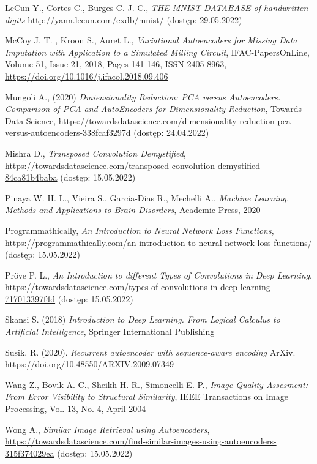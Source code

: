 \documentclass[12pt]{mwbk}
\theoremstyle{plain}
\theoremstyle{definition}
\theoremstyle{remark}
\begin{document}
\begin{thebibliography}{99}
 LeCun Y., Cortes C., Burges C. J. C., \emph{THE MNIST DATABASE of handwritten digits} \url{http://yann.lecun.com/exdb/mnist/} (dostęp: 29.05.2022)

 McCoy J. T. , Kroon S.,  Auret L.,
\emph{Variational Autoencoders for Missing Data Imputation with Application to a Simulated Milling Circuit},
IFAC-PapersOnLine,
 Volume 51, Issue 21,
 2018,
 Pages 141-146,
 ISSN 2405-8963, \url{https://doi.org/10.1016/j.ifacol.2018.09.406}

 Mungoli A., (2020) \emph{Dmiensionality Reduction: PCA versus Autoencoders. Comparison of PCA and AutoEncoders for Dimensionality Reduction}, Towards Data Science, \url{https://towardsdatascience.com/dimensionality-reduction-pca-versus-autoencoders-338fcaf3297d} (dostęp: 24.04.2022)

 Mishra D., \emph{Transposed Convolution Demystified}, \url{https://towardsdatascience.com/transposed-convolution-demystified-84ca81b4baba} (dostęp: 15.05.2022)



 Pinaya W. H. L., Vieira S., Garcia-Dias R., Mechelli A., \emph{Machine Learning. Methods and Applications to Brain Disorders}, Academic Press,
2020

 Programmathically, \emph{An Introduction to Neural Network Loss Functions}, \url{https://programmathically.com/an-introduction-to-neural-network-loss-functions/} (dostęp: 15.05.2022)

 Pröve P. L., \emph{An Introduction to different Types of Convolutions in Deep Learning}, \url{https://towardsdatascience.com/types-of-convolutions-in-deep-learning-717013397f4d} (dostęp: 15.05.2022)

 Skansi S. (2018) \emph{Introduction to Deep Learning. From Logical Calculus to Artificial Intelligence}, Springer International Publishing

 Susik, R. (2020). \emph{Recurrent autoencoder with sequence-aware encoding} ArXiv. https://doi.org/10.48550/ARXIV.2009.07349 

 Wang Z., Bovik A. C., Sheikh H. R., Simoncelli E. P., \emph{Image Quality Assesment: From Error Visibility to Structural Similarity}, IEEE Transactions on Image Processing, Vol. 13, No. 4, April 2004

 Wong A., \emph{Similar Image Retrieval using Autoencoders}, \url{https://towardsdatascience.com/find-similar-images-using-autoencoders-315f374029ea} (dostęp: 15.05.2022)

\end{thebibliography}
\end{document}
